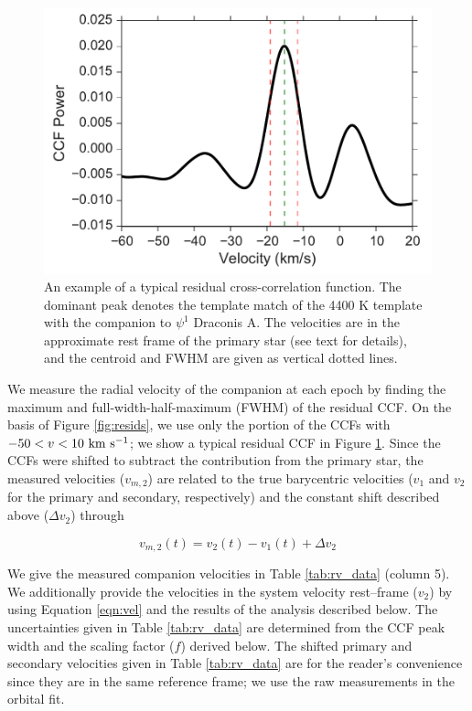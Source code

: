\documentclass[twocolumn]{emulateapj}
\begin{document}
\begin{figure}
  \centering
  \includegraphics[width=\columnwidth]{Typical_CCF.pdf}
  \caption{An example of a typical residual cross-correlation function. The dominant peak denotes the template match of the 4400 K template with the companion to $\psi^1$ Draconis A. The velocities are in the approximate rest frame of the primary star (see text for details), and the centroid and FWHM are given as vertical dotted lines.}
  \label{fig:ccf_typical}
\end{figure}




We measure the radial velocity of the companion at each epoch by finding the maximum and full-width-half-maximum (FWHM) of the residual CCF. On the basis of Figure \ref{fig:resids}, we use only the portion of the CCFs with $-50 < v < 10\ \rm km\ s^{-1}$; we show a typical residual CCF in Figure \ref{fig:ccf_typical}. Since the CCFs were shifted to subtract the contribution from the primary star, the measured velocities ($v_{m, 2}$) are related to the true barycentric velocities ($v_1$ and $v_2$ for the primary and secondary, respectively) and the constant shift described above ($\Delta v_2$) through

\begin{equation}
v_{m, 2}(t) = v_2(t) - v_1(t) + \Delta v_2
\label{eqn:vel}
\end{equation}

We give the measured companion velocities in Table \ref{tab:rv_data} (column 5). We additionally provide the velocities in the system velocity rest--frame ($v_2$) by using Equation \ref{eqn:vel} and the results of the analysis described below. The uncertainties given in Table \ref{tab:rv_data} are determined from the CCF peak width and the scaling factor ($f$) derived below. The shifted primary and secondary velocities given in Table \ref{tab:rv_data} are for the reader's convenience since they are in the same reference frame; we use the raw measurements in the orbital fit.
\end{document}
